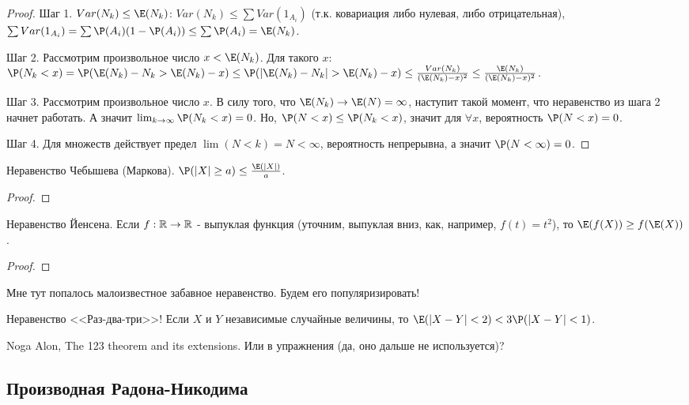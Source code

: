 {\begin{proof}
Шаг 1. $Var(N_{k})\leq \E(N_{k})$: $Var(N_{k})\leq \sum Var(1_{A_{i}})$ (т.к. ковариация либо нулевая, либо отрицательная), $\sum Var(1_{A_{i}})=\sum \P(A_{i})(1-\P(A_{i}))\leq \sum \P(A_{i}) =\E(N_{k})$.

Шаг 2. Рассмотрим произвольное число $x<\E(N_{k})$. Для такого $x$: $\P(N_{k}<x)=\P(\E(N_{k})-N_{k}>\E(N_{k})-x)\leq \P(|\E(N_{k})-N_{k}|>\E(N_{k})-x)\leq \frac{Var(N_{k})}{(\E(N_{k})-x)^2}\leq \frac{\E(N_{k})}{(\E(N_{k})-x)^2}$.

Шаг 3. Рассмотрим произвольное число $x$. В силу того, что $\E(N_{k})\to \E(N)=\infty$, наступит такой момент, что неравенство из шага 2 начнет работать. А значит $\lim_{k\to\infty} \P(N_{k}<x)=0$. Но, $\P(N<x)\leq \P(N_{k}<x)$, значит для $\forall x$, вероятность $\P(N<x)=0$.

Шаг 4. Для множеств действует предел $\lim (N<k)=N<\infty$, вероятность непрерывна,  а значит $\P(N<\infty)=0$.
\end{proof}


Неравенство Чебышева (Маркова). $\P(|X|\geq a)\leq \frac{\E(|X|)}{a}$. 
\begin{proof}
\end{proof}
Неравенство Йенсена. Если $f:\mathbb{R}\to\mathbb{R}$ - выпуклая функция (уточним, выпуклая вниз, как, например, $f(t)=t^{2}$), то $\E(f(X))\geq f(\E(X))$.
\begin{proof}
\end{proof}
Мне тут попалось малоизвестное забавное неравенство. Будем его популяризировать!

Неравенство <<Раз-два-три>>! Если $X$ и $Y$ независимые случайные величины, то $\E(|X-Y|<2)<3\P(|X-Y|<1)$.

Noga Alon, The 123 theorem and its extensions. Или в упражнения (да, оно дальше не используется)?






}\subsection{Производная Радона-Никодима} 
